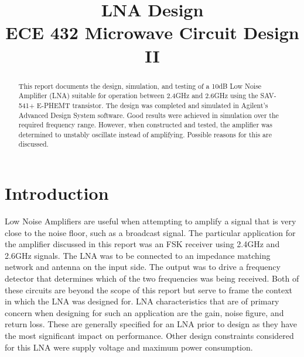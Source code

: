 \documentclass[conference]{IEEEtran}
\begin{document}
\title{LNA Design\\ECE 432 Microwave Circuit Design II}
\author{
\and
{}
}
\maketitle
\IEEEpeerreviewmaketitle

\begin{abstract}
This report documents the design, simulation, and testing of a 10dB Low Noise Amplifier (LNA) suitable for operation between 2.4GHz and 2.6GHz using the SAV-541+ E-PHEMT transistor. The design was completed and simulated in Agilent's Advanced Design System software. Good results were achieved in simulation over the required frequency range. However, when constructed and tested, the amplifier was determined to unstably oscillate instead of amplifying. Possible reasons for this are discussed.
\end{abstract}

\section{Introduction}
Low Noise Amplifiers are useful when attempting to amplify a signal that is very close to the noise floor, such as a broadcast signal. The particular application for the amplifier discussed in this report was an FSK receiver using 2.4GHz and 2.6GHz signals. The LNA was to be connected to an impedance matching network and antenna on the input side. The output was to drive a frequency detector that determines which of the two frequencies was being received. Both of these circuits are beyond the scope of this report but serve to frame the context in which the LNA was designed for. LNA characteristics that are of primary concern when designing for such an application are the gain, noise figure, and return loss. These are generally specified for an LNA prior to design as they have the most significant impact on performance. Other design constraints considered for this LNA were supply voltage and maximum power consumption.
\end{document}
